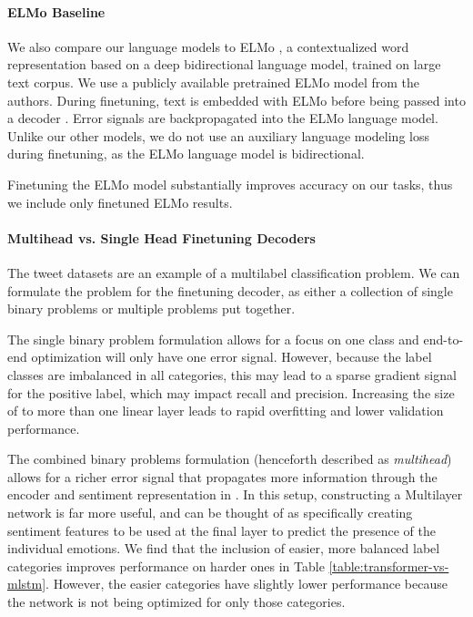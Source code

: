 \documentclass[letterpaper]{article} \usepackage{aaai19}  \usepackage{times}  \usepackage{helvet}  \usepackage{courier}  \usepackage{url}  \usepackage{graphicx}  \usepackage{booktabs}
\begin{document}
\paragraph{ELMo Baseline}
We also compare our language models to ELMo \protect\cite{ELMo}, a contextualized word representation based on a deep bidirectional language model, trained on large text corpus. We use a publicly available pretrained ELMo model from the authors. During finetuning, text is embedded with ELMo before being passed into a decoder . Error signals are backpropagated into the ELMo language model. Unlike our other models, we do not use an auxiliary language modeling loss during finetuning, as the ELMo language model is bidirectional.

Finetuning the ELMo model substantially improves accuracy on our tasks, thus we include only finetuned ELMo results. 

\paragraph{Multihead vs. Single Head Finetuning Decoders}
The tweet datasets are an example of a multilabel classification problem. We can formulate the problem for the finetuning decoder,  as either a collection of single binary problems or multiple problems put together. 

The single binary problem formulation allows for a focus on one class and end-to-end optimization will only have one error signal. However, because the label classes are imbalanced in all categories, this may lead to a sparse gradient signal for the positive label, which may impact recall and precision. Increasing the size of  to more than one linear layer leads to rapid overfitting and lower validation performance.

The combined binary problems formulation (henceforth described as \textit{multihead}) allows for a richer error signal that propagates more information through the encoder  and sentiment representation in . In this setup, constructing a Multilayer network is far more useful, and can be thought of as specifically creating sentiment features to be used at the final layer to predict the presence of the individual emotions. We find that the inclusion of easier, more balanced label categories improves performance on harder ones in Table \ref{table:transformer-vs-mlstm}. However, the easier categories have slightly lower performance because the network is not being optimized for only those categories. 
\end{document}
